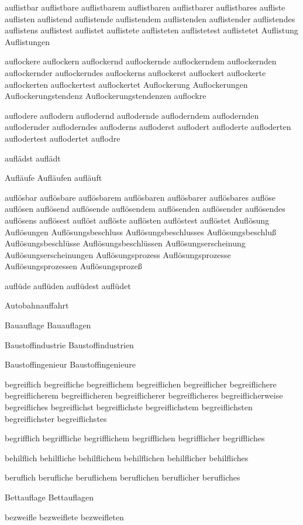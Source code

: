 auflistbar auflistbare auflistbarem auflistbaren auflistbarer auflistbares aufliste auflisten auflistend auflistende auflistendem auflistenden auflistender auflistendes auflistens auflistest auflistet auflistete auflisteten auflistetest auflistetet Auflistung Auflistungen

auflockere auflockern auflockernd auflockernde auflockerndem auflockernden auflockernder auflockerndes auflockerns auflockerst auflockert auflockerte auflockerten auflockertest auflockertet Auflockerung Auflockerungen Auflockerungstendenz Auflockerungstendenzen auflockre

auflodere auflodern auflodernd auflodernde aufloderndem auflodernden auflodernder aufloderndes aufloderns aufloderst auflodert aufloderte aufloderten auflodertest auflodertet auflodre

auflädst auflädt

Aufläufe Aufläufen aufläuft

auflösbar auflösbare auflösbarem auflösbaren auflösbarer auflösbares auflöse auflösen auflösend auflösende auflösendem auflösenden auflösender auflösendes auflösens auflösest auflöst auflöste auflösten auflöstest auflöstet Auflösung Auflösungen Auflösungsbeschluss Auflösungsbeschlusses Auflösungsbeschluß Auflösungsbeschlüsse Auflösungsbeschlüssen Auflösungserscheinung Auflösungserscheinungen Auflösungsprozess Auflösungsprozesse Auflösungsprozessen Auflösungsprozeß

auflüde auflüden auflüdest auflüdet

Autobahnauffahrt

Bauauflage Bauauflagen

Baustoffindustrie Baustoffindustrien

Baustoffingenieur Baustoffingenieure

begreiflich begreifliche begreiflichem begreiflichen begreiflicher begreiflichere begreiflicherem begreiflicheren begreiflicherer begreiflicheres begreiflicherweise begreifliches begreiflichst begreiflichste begreiflichstem begreiflichsten begreiflichster begreiflichstes

begrifflich begriffliche begrifflichem begrifflichen begrifflicher begriffliches

behilflich behilfliche behilflichem behilflichen behilflicher behilfliches

beruflich berufliche beruflichem beruflichen beruflicher berufliches

Bettauflage Bettauflagen

bezweifle bezweiflete bezweifleten

